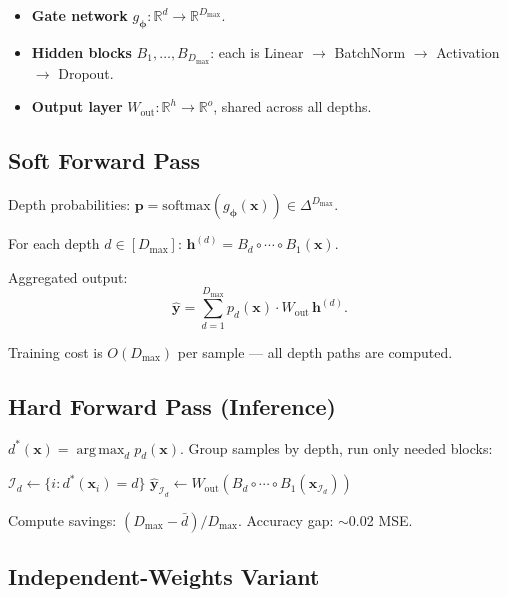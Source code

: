 \documentclass[11pt,a4paper]{article}
\theoremstyle{definition}
\newcommand{\R}{\mathbb{R}}
\newcommand{\bx}{\mathbf{x}}
\newcommand{\by}{\mathbf{y}}
\newcommand{\bphi}{\boldsymbol{\phi}}
\newcommand{\softmax}{\mathrm{softmax}}
\DeclareMathOperator*{\argmax}{arg\,max}
\begin{document}
\begin{itemize}[nosep]
  \item \textbf{Gate network} $g_\bphi: \R^d \to \R^{D_{\max}}$.
  \item \textbf{Hidden blocks} $B_1, \ldots, B_{D_{\max}}$: each is Linear $\to$ BatchNorm $\to$ Activation $\to$ Dropout.
  \item \textbf{Output layer} $W_{\mathrm{out}}: \R^{h} \to \R^{o}$, shared across all depths.
\end{itemize}

\subsection{Soft Forward Pass}

Depth probabilities: $\mathbf{p} = \softmax(g_\bphi(\bx)) \in \Delta^{D_{\max}}$.

For each depth $d \in [D_{\max}]$: $\mathbf{h}^{(d)} = B_d \circ \cdots \circ B_1(\bx)$.

Aggregated output:
\begin{equation}
  \hat{\by} = \sum_{d=1}^{D_{\max}} p_d(\bx) \cdot W_{\mathrm{out}} \, \mathbf{h}^{(d)}.
  \label{eq:flex_soft}
\end{equation}

Training cost is $O(D_{\max})$ per sample --- all depth paths are computed.

\subsection{Hard Forward Pass (Inference)}

$d^*(\bx) = \argmax_{d} p_d(\bx)$. Group samples by depth, run only needed blocks:

\begin{algorithm}[H]
\caption{Hard inference for FlexibleNN}
\begin{algorithmic}[1]
  \State $\mathcal{I}_d \gets \{i : d^*(\bx_i) = d\}$
    \State $\hat{\by}_{\mathcal{I}_d} \gets W_{\mathrm{out}}(B_d \circ \cdots \circ B_1(\bx_{\mathcal{I}_d}))$
  \EndIf
\EndFor
\end{algorithmic}
\end{algorithm}

Compute savings: $(D_{\max} - \bar{d}) / D_{\max}$. Accuracy gap: $\sim$0.02 MSE.

\subsection{Independent-Weights Variant}
\end{document}
